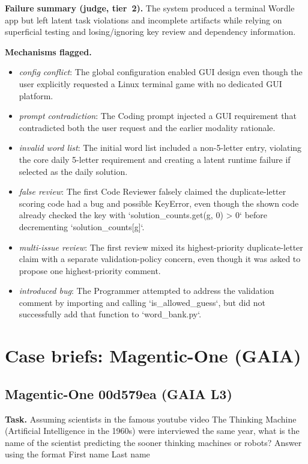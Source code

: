 \textbf{Failure summary (judge, tier~2).} The system produced a terminal Wordle app but left latent task violations and incomplete artifacts while relying on superficial testing and losing/ignoring key review and dependency information.

\textbf{Mechanisms flagged.}
\begin{itemize}
  \item \emph{config conflict}: The global configuration enabled GUI design even though the user explicitly requested a Linux terminal game with no dedicated GUI platform.
  \item \emph{prompt contradiction}: The Coding prompt injected a GUI requirement that contradicted both the user request and the earlier modality rationale.
  \item \emph{invalid word list}: The initial word list included a non-5-letter entry, violating the core daily 5-letter requirement and creating a latent runtime failure if selected as the daily solution.
  \item \emph{false review}: The first Code Reviewer falsely claimed the duplicate-letter scoring code had a bug and possible KeyError, even though the shown code already checked the key with `solution\_counts.get(g, 0) > 0` before decrementing `solution\_counts[g]`.
  \item \emph{multi-issue review}: The first review mixed its highest-priority duplicate-letter claim with a separate validation-policy concern, even though it was asked to propose one highest-priority comment.
  \item \emph{introduced bug}: The Programmer attempted to address the validation comment by importing and calling `is\_allowed\_guess`, but did not successfully add that function to `word\_bank.py`.
\end{itemize}

\clearpage
\section{Case briefs: Magentic-One (GAIA)}\label{app:magentic}

\subsection*{Magentic-One 00d579ea (GAIA L3)}
\textbf{Task.} Assuming scientists in the famous youtube video The Thinking Machine (Artificial Intelligence in the 1960s) were interviewed the same year, what is the name of the scientist predicting the sooner thinking machines or robots? Answer using the format First name Last name

